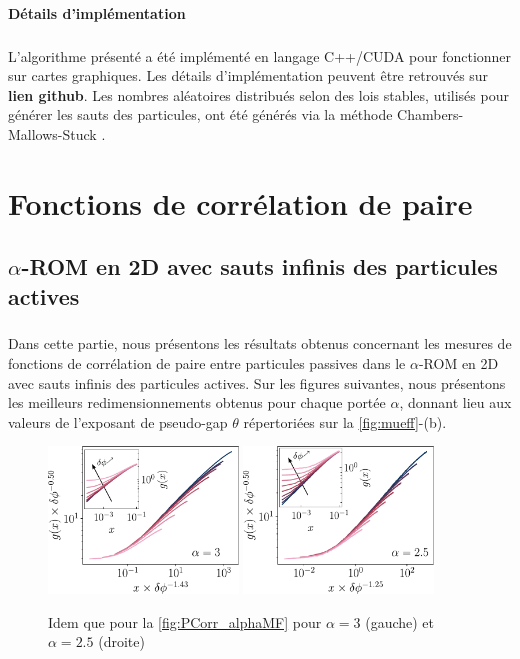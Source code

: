 \paragraph{Détails d'implémentation}

\subparagraph{}L'algorithme présenté a été implémenté en langage C++/CUDA pour fonctionner sur cartes graphiques. Les détails d'implémentation peuvent être retrouvés sur \textbf{lien github}. Les nombres aléatoires distribués selon des lois stables, utilisés pour générer les sauts des particules, ont été générés via la méthode Chambers-Mallows-Stuck \cite{chambers_method_1976, weron_chambers_mallows_stuck_1996}.

\section{Fonctions de corrélation de paire}

\stoptocwriting

\label{sec:PCorr}

\subsection{$\alpha$-ROM en 2D avec sauts infinis des particules actives}

\subparagraph{}Dans cette partie, nous présentons les résultats obtenus concernant les mesures de fonctions de corrélation de paire entre particules passives dans le $\alpha$-ROM en 2D avec sauts infinis des particules actives. Sur les figures suivantes, nous présentons les meilleurs redimensionnements obtenus pour chaque portée $\alpha$, donnant lieu aux valeurs de l'exposant de pseudo-gap $\theta$ répertoriées sur la \autoref{fig:mueff}-(b).

\begin{figure}[h]
\centering
\includegraphics[width=0.45\textwidth]{Chapitre3/Figures/Interpretation/PCorrMF/PCorr_rescaled_MF_alpha3.pdf}
\includegraphics[width=0.45\textwidth]{Chapitre3/Figures/Interpretation/PCorrMF/PCorr_rescaled_MF_alpha25.pdf}
\caption{Idem que pour la \autoref{fig:PCorr_alphaMF} pour $\alpha = 3$ (gauche) et $\alpha = 2.5$ (droite)}
\label{fig:PCorrAnnexe1}
\end{figure}

